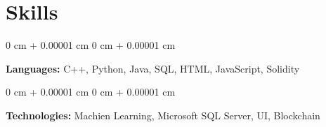 \documentclass[10pt, letterpaper]{article}
\newenvironment{onecolentry}{
    \begin{adjustwidth}{
        0 cm + 0.00001 cm
    }{
        0 cm + 0.00001 cm
    }
}{
    \end{adjustwidth}
} %
\begin{document}
    
    \section{Skills}
        \begin{onecolentry}
            \textbf{Languages:} C++, Python, Java, SQL, HTML, JavaScript, Solidity
        \end{onecolentry}

        \vspace{0.2 cm}

        \begin{onecolentry}
            \textbf{Technologies:} Machien Learning, Microsoft SQL Server, UI, Blockchain
        \end{onecolentry}
\end{document}
